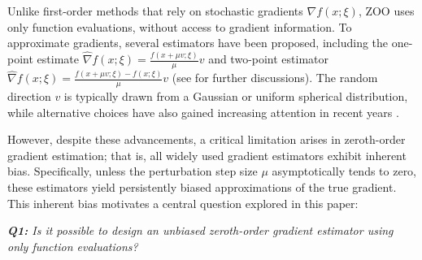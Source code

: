 \documentclass{article}
\theoremstyle{definition}
\theoremstyle{plain}
\theoremstyle{remark}
\newcommand{\centerbox}[1]{\begin{center}\begin{minipage}{0.86\linewidth}
\begin{bluebox} 
\textit{{#1}}
\end{bluebox} \end{minipage}\end{center}}
\begin{document}
Unlike first-order methods that rely on stochastic gradients $\nabla f(x; \xi)$, ZOO uses only function evaluations, without access to gradient information. To approximate gradients, several estimators have been proposed, including the one-point estimate $\hat{\nabla} f(x;\xi)= \frac{f(x+\mu v;\xi)}{\mu} v$ \citep{flaxman2005online,shamir2013complexity,bach2016highly,nesterov2017random,berahas2022theoretical} and two-point estimator $\hat{\nabla} f(x;\xi)= \frac{f(x+\mu v;\xi) - f(x;\xi)}{\mu}v$ \citep{ghadimi2013stochastic,duchi2015optimal,nesterov2017random} (see  for further discussions). The random direction $v$ is typically drawn from a Gaussian or uniform spherical distribution, while alternative choices have also gained increasing attention in recent years \citep{ghadimi2013stochastic, duchi2015optimal, ji2019improved, sahu2019towards, coope2020gradient, kozak2023zeroth, rando2023optimal, rando2024stochastic, ma2025revisiting,mi2025kerzoo}.



However, despite these advancements, a critical limitation arises in zeroth-order gradient estimation; that is, all widely used gradient estimators exhibit inherent bias. Specifically, unless the perturbation step size $\mu$  asymptotically tends to zero, these estimators yield persistently biased approximations of the true gradient. This inherent bias motivates a central question explored in this paper:

\centerbox{\textbf{Q1:} Is it possible to design an unbiased zeroth-order gradient estimator using only function evaluations?}  
 
\end{document}
